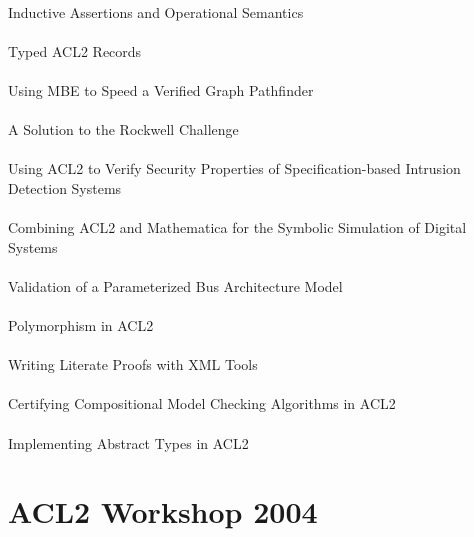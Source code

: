 \documentclass{article}
\begin{document}
\cite{03-moore-assertions} \\
Inductive Assertions and Operational Semantics \\

\cite{03-greve-typed} \\
Typed ACL2 Records \\

\cite{03-greve-mbe} \\
Using MBE to Speed a Verified Graph Pathfinder \\

\cite{03-liu-rockwell} \\
A Solution to the Rockwell Challenge \\

\cite{03-song-security} \\
Using ACL2 to Verify Security Properties of Specification-based Intrusion Detection Systems \\

\cite{03-al-sammane-mathematica} \\
Combining ACL2 and Mathematica for the Symbolic Simulation of Digital Systems \\

\cite{03-schmaltz-bus} \\
Validation of a Parameterized Bus Architecture Model \\

\cite{03-gamboa-polymorphism} \\
Polymorphism in ACL2 \\

\cite{03-gamboa-literate} \\
Writing Literate Proofs with XML Tools \\

\cite{03-ray-modelchecking} \\
Certifying Compositional Model Checking Algorithms in ACL2 \\

\cite{03-austel-types} \\
Implementing Abstract Types in ACL2 \\


\section{ACL2 Workshop 2004}
\end{document}
